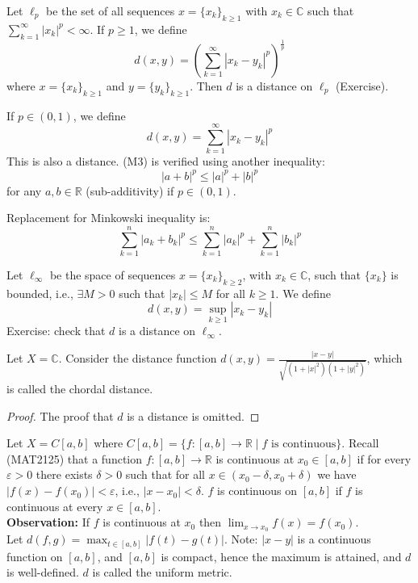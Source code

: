 \begin{remark}
Let $\ell_p$ be the set of all sequences $x=\{x_k\}_{k\geq 1}$ with $x_k \in \mathbb{C}$ such that $\sum_{k=1}^{\infty} |x_k|^p < \infty$. If $p \geq 1$, we define
\[ d(x,y) = \left( \sum_{k=1}^{\infty} |x_k - y_k|^p \right)^{\frac{1}{p}} \]
where $x=\{x_k\}_{k\geq 1}$ and $y=\{y_k\}_{k\geq 1}$. Then $d$ is a distance on $\ell_p$ (Exercise).
\end{remark}

\begin{remark}
If $p \in (0,1)$, we define
\[ d(x,y) = \sum_{k=1}^{\infty} |x_k - y_k|^p \]
This is also a distance. (M3) is verified using another inequality:
\[ |a+b|^p \leq |a|^p + |b|^p \]
for any $a,b \in \mathbb{R}$ (sub-additivity) if $p \in (0,1)$.

Replacement for Minkowski inequality is:
\[ \sum_{k=1}^n |a_k+b_k|^p \leq \sum_{k=1}^n |a_k|^p + \sum_{k=1}^n |b_k|^p \]
\end{remark}

\begin{remark}
Let $\ell_\infty$ be the space of sequences $x=\{x_k\}_{k\geq 2}$, with $x_k \in \mathbb{C}$, such that $\{x_k\}$ is bounded, i.e., $\exists M>0$ such that $|x_k| \leq M$ for all $k\geq 1$.
We define
\[ d(x,y) = \sup_{k \geq 1} |x_k - y_k| \]
Exercise: check that $d$ is a distance on $\ell_\infty$.
\end{remark}

\begin{example}
Let $X = \mathbb{C}$. Consider the distance function $d(x,y) = \frac{|x-y|}{\sqrt{(1+|x|^2)(1+|y|^2)}}$, which is called the chordal distance.
\end{example}
\begin{proof}
The proof that $d$ is a distance is omitted.
\end{proof} 

\begin{example}
Let $X = C[a,b]$ where $C[a,b] = \{ f : [a,b] \rightarrow \mathbb{R} \mid f \text{ is continuous} \}$. Recall (MAT2125) that a function $f: [a,b] \rightarrow \mathbb{R}$ is continuous at $x_0 \in [a,b]$ if for every $\varepsilon > 0$ there exists $\delta > 0$ such that for all $x \in (x_0 - \delta, x_0 + \delta)$ we have $|f(x) - f(x_0)| < \varepsilon$, i.e., $|x-x_0| < \delta$. $f$ is continuous on $[a,b]$ if $f$ is continuous at every $x \in [a,b]$.
\\
\textbf{Observation:} If $f$ is continuous at $x_0$ then $\lim_{x \to x_0} f(x) = f(x_0)$.
\\
Let $d(f,g) = \max_{t \in [a,b]} |f(t) - g(t)|$. Note: $|x-y|$ is a continuous function on $[a,b]$, and $[a,b]$ is compact, hence the maximum is attained, and $d$ is well-defined. $d$ is called the uniform metric.
\end{example}
